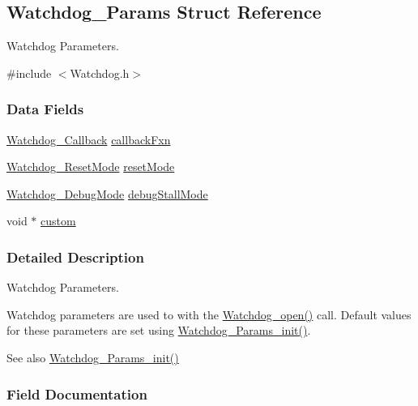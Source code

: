 \subsection{Watchdog\+\_\+\+Params Struct Reference}
\label{struct_watchdog___params}


Watchdog Parameters.  




{\ttfamily \#include $<$Watchdog.\+h$>$}

\subsubsection*{Data Fields}
\begin{DoxyCompactItemize}
\item 
\hyperlink{_watchdog_8h_abb9d5f385013e9950884200d8d05fd05}{Watchdog\+\_\+\+Callback} \hyperlink{struct_watchdog___params_a710aaa2504356ab3d3f9a27ac19ddb85}{callback\+Fxn}
\item 
\hyperlink{_watchdog_8h_ada0db7216129d7dad494bb0cd0169f88}{Watchdog\+\_\+\+Reset\+Mode} \hyperlink{struct_watchdog___params_a94b5d650f8beb7dce719360404039ccf}{reset\+Mode}
\item 
\hyperlink{_watchdog_8h_ab1aa5862661c88a16b9d7bc12709d51e}{Watchdog\+\_\+\+Debug\+Mode} \hyperlink{struct_watchdog___params_abe7792eef8afa2972a4625f428b7241b}{debug\+Stall\+Mode}
\item 
void $\ast$ \hyperlink{struct_watchdog___params_aa2d75e83d9cb6bf71400934b709ec234}{custom}
\end{DoxyCompactItemize}


\subsubsection{Detailed Description}
Watchdog Parameters. 

Watchdog parameters are used to with the \hyperlink{_watchdog_8h_aa5ce656aa6d5199e1efdb4ca2cd9fb7c}{Watchdog\+\_\+open()} call. Default values for these parameters are set using \hyperlink{_watchdog_8h_a6a6f54cfdac33d3bf33464a212262afc}{Watchdog\+\_\+\+Params\+\_\+init()}.

\begin{DoxySeeAlso}{See also}
\hyperlink{_watchdog_8h_a6a6f54cfdac33d3bf33464a212262afc}{Watchdog\+\_\+\+Params\+\_\+init()} 
\end{DoxySeeAlso}


\subsubsection{Field Documentation}

